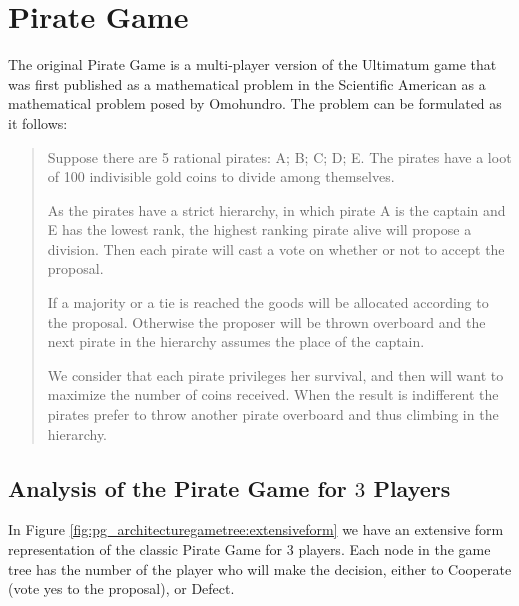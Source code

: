 \documentclass[10pt,twocolumn]{llncs}
\begin{document}
\section{Pirate Game}
\label{subsec:description}

The original Pirate Game is a multi-player version of the Ultimatum game that was first published as a mathematical problem in the Scientific American as a mathematical problem posed by Omohundro\cite{Stewart1999}. The problem can be formulated as it follows:

\begin{quotation}
Suppose there are 5 rational pirates: A; B; C; D; E. The pirates have a  loot of 100 indivisible gold coins to divide among themselves.


As the pirates have a strict hierarchy, in which pirate A is the captain and E has the lowest rank, the highest ranking pirate alive will propose a division. Then each pirate will cast a vote on whether or not to accept the proposal. 

If a majority or a tie is reached the goods will be allocated according to the proposal. Otherwise the proposer will be thrown overboard and the next pirate in the hierarchy assumes the place of the captain. 

We consider that each pirate privileges her survival, and then will want to maximize the number of coins received. When the result is indifferent the pirates prefer to throw another pirate overboard and thus climbing in the hierarchy. 
\end{quotation}

\subsection{Analysis of the Pirate Game for $3$ Players}
\label{subsubsec:analysis_PG3players}

In Figure \ref{fig:pg_architecturegametree:extensiveform} we have an extensive form representation of the classic Pirate Game for $3$ players. Each node in the game tree has the number of the player who will make the decision, either to Cooperate (vote yes to the proposal), or Defect. 
\end{document}
